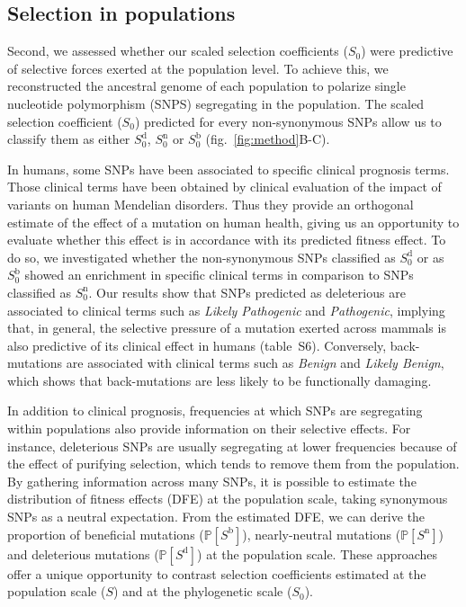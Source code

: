 \documentclass{article}
\newcommand{\proba}{\mathbb{P}}
\newcommand{\Sphy}{S_{0}}
\newcommand{\Spop}{S}
\newcommand{\PpolyDel}{\proba [ \Spop^{\text{d}}]}
\newcommand{\PpolyNeutral}{\proba [ \Spop^{\text{n}} ]}
\newcommand{\PpolyAdv}{\proba [ \Spop^{\text{b}} ]}
\begin{document}
    \subsection*{Selection in populations}
    Second, we assessed whether our scaled selection coefficients ($\Sphy$) were predictive of selective forces exerted at the population level.
    To achieve this, we reconstructed the ancestral genome of each population to polarize single nucleotide polymorphism (SNPS) segregating in the population.
    The scaled selection coefficient ($\Sphy$) predicted for every non-synonymous SNPs allow us to classify them as either $\Sphy^{\text{d}}$, $\Sphy^{\text{n}}$ or $\Sphy^{\text{b}}$ (fig.~\ref{fig:method}B-C).

    In humans, some SNPs have been associated to specific clinical prognosis terms\cite{landrum_clinvar_2018}. Those clinical terms have been obtained by clinical evaluation of the impact of variants on human Mendelian disorders\cite{landrum_clinvar_2018}. Thus they provide an orthogonal estimate of the effect of a mutation on human health, giving us an opportunity to evaluate whether this effect is in accordance with its predicted fitness effect.
    To do so, we investigated whether the non-synonymous SNPs classified as $\Sphy^{\text{d}}$ or as $\Sphy^{\text{b}}$ showed an enrichment in specific clinical terms in comparison to SNPs classified as $\Sphy^{\text{n}}$.
    Our results show that SNPs predicted as deleterious are associated to clinical terms such as \textit{Likely Pathogenic} and \textit{Pathogenic}, implying that, in general, the selective pressure of a mutation exerted across mammals is also predictive of its clinical effect in humans (table~S6).
    Conversely, back-mutations are associated with clinical terms such as \textit{Benign} and \textit{Likely Benign}, which shows that back-mutations are less likely to be functionally damaging.

    In addition to clinical prognosis, frequencies at which SNPs are segregating within populations also provide information on their selective effects.
    For instance, deleterious SNPs are usually segregating at lower frequencies because of the effect of purifying selection, which tends to remove them from the population.
    By gathering information across many SNPs, it is possible to estimate the distribution of fitness effects (DFE) at the population scale, taking synonymous SNPs as a neutral expectation\cite{eyre-walker_distribution_2006, eyre-walker_estimating_2009, galtier_adaptive_2016, tataru_inference_2017}.
    From the estimated DFE, we can derive the proportion of beneficial mutations ($\PpolyAdv$), nearly-neutral mutations ($\PpolyNeutral$) and deleterious mutations ($\PpolyDel$) at the population scale.
    These approaches offer a unique opportunity to contrast selection coefficients estimated at the population scale ($\Spop$) and at the phylogenetic scale ($\Sphy$).
\end{document}
